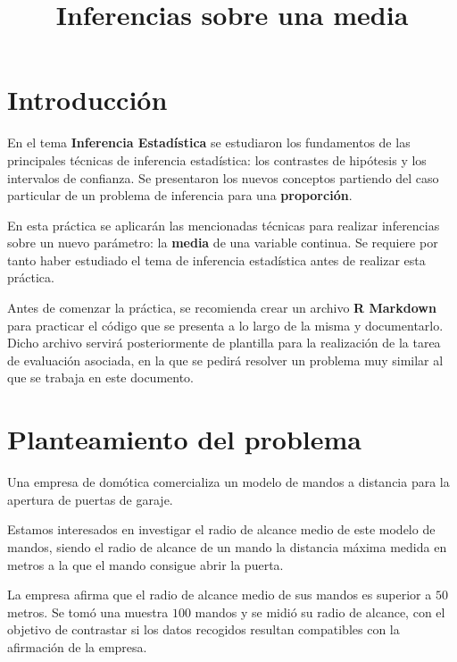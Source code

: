 \documentclass[
  degree=mecinf,
  title=normal,
  toc=normal,
  bib=normal]{mnye}
\title{Inferencias sobre una media}
\begin{document}

\hypertarget{section}{%
\section*{}\label{section}}

\hypertarget{intro}{%
\section*{Introducción}\label{intro}}

En el tema \textbf{Inferencia Estadística} se estudiaron los fundamentos de las principales técnicas de inferencia estadística: los contrastes de hipótesis y los intervalos de confianza. Se presentaron los nuevos conceptos partiendo del caso particular de un problema de inferencia para una \textbf{proporción}.

En esta práctica se aplicarán las mencionadas técnicas para realizar inferencias sobre un nuevo parámetro: la \textbf{media} de una variable continua. Se requiere por tanto haber estudiado el tema de inferencia estadística antes de realizar esta práctica.

Antes de comenzar la práctica, se recomienda crear un archivo \textbf{R Markdown} para practicar el código que se presenta a lo largo de la misma y documentarlo. Dicho archivo servirá posteriormente de plantilla para la realización de la tarea de evaluación asociada, en la que se pedirá resolver un problema muy similar al que se trabaja en este documento.

\hypertarget{problem}{%
\section{Planteamiento del problema}\label{problem}}

\begin{ebox}{}
Una empresa de domótica comercializa un modelo de mandos a distancia para la apertura de puertas de garaje.

Estamos interesados en investigar el radio de alcance medio de este modelo de mandos, siendo el radio de alcance de un mando la distancia máxima medida en metros a la que el mando consigue abrir la puerta.

La empresa afirma que el radio de alcance medio de sus mandos es superior a \(50\) metros. Se tomó una muestra \(100\) mandos y se midió su radio de alcance, con el objetivo de contrastar si los datos recogidos resultan compatibles con la afirmación de la empresa.

\end{ebox}
\end{document}
